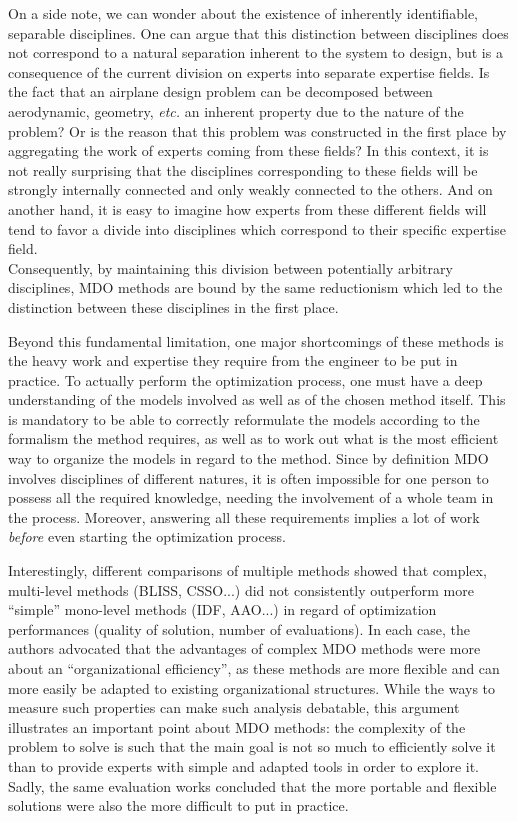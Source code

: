 On a side note, we can wonder about the existence of inherently identifiable, separable disciplines. One can argue that this distinction between disciplines does not correspond to a natural separation inherent to the system to design, but is a consequence of the current division on experts into separate expertise fields. Is the fact that an airplane design problem can be decomposed between aerodynamic, geometry, \emph{etc.} an inherent property due to the nature of the problem? Or is the reason that this problem was constructed in the first place by aggregating the work of experts coming from these fields? In this context, it is not really surprising that the disciplines corresponding to these fields will be strongly internally connected and only weakly connected to the others. And on another hand, it is easy to imagine how experts from these different fields will tend to favor a divide into disciplines which correspond to their specific expertise field.\\ Consequently, by maintaining this division between potentially arbitrary disciplines, MDO methods are bound by the same reductionism which led to the distinction between these disciplines in the first place.

Beyond this fundamental limitation, one major shortcomings of these methods is the heavy work and expertise they require from the engineer to be put in practice. To actually perform the optimization process, one must have a deep understanding of the models involved as well as of the chosen method itself. This is mandatory to be able to correctly reformulate the models according to the formalism the method requires, as well as to work out what is the most efficient way to organize the models in regard to the method. Since by definition MDO involves disciplines of different natures, it is often impossible for one person to possess all the required knowledge, needing the involvement of a whole team in the process. Moreover, answering all these requirements implies a lot of work \emph{before} even starting the optimization process.

Interestingly, different comparisons of multiple methods \cite{perez2004evaluation,Yi2008} showed that complex, multi-level methods (BLISS, CSSO...) did not consistently outperform more \enquote{simple} mono-level methods (IDF, AAO...) in regard of optimization performances (quality of solution, number of evaluations). In each case, the authors advocated that the advantages of complex MDO methods were more about an \enquote{organizational efficiency}, as these methods are more flexible and can more easily be adapted to existing organizational structures. While the ways to measure such properties can make such analysis debatable, this argument illustrates an important point about MDO methods: the complexity of the problem to solve is such that the main goal is not so much to efficiently solve it than to provide experts with simple and adapted tools in order to explore it. Sadly, the same evaluation works concluded that the more portable and flexible solutions were also the more difficult to put in practice.

